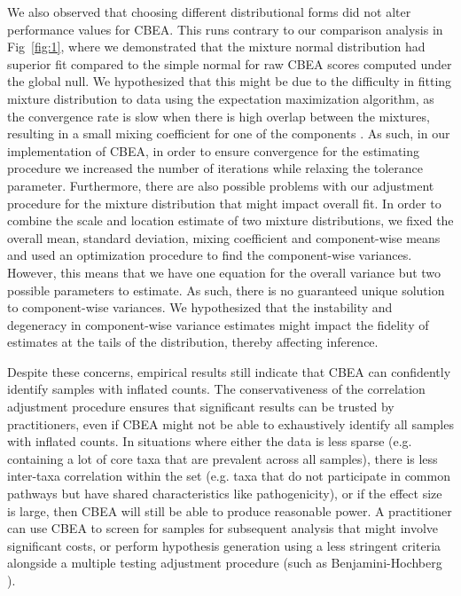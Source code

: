 \documentclass[10pt,letterpaper]{article}
\begin{document}
We also observed that choosing different distributional forms did not alter performance values for CBEA. This runs contrary to our comparison analysis in Fig~\ref{fig:1}, where we demonstrated that the mixture normal distribution had superior fit compared to the simple normal for raw CBEA scores computed under the global null. We hypothesized that this might be due to the difficulty in fitting mixture distribution to data using the expectation maximization algorithm, as the convergence rate is slow when there is high overlap between the mixtures, resulting in a small mixing coefficient for one of the components \cite{naim2012}. As such, in our implementation of CBEA, in order to ensure convergence for the estimating procedure we increased the number of iterations while relaxing the tolerance parameter. Furthermore, there are also possible problems with our adjustment procedure for the mixture distribution that might impact overall fit. In order to combine the scale and location estimate of two mixture distributions, we fixed the overall mean, standard deviation, mixing coefficient and component-wise means and used an optimization procedure to find the component-wise variances. However, this means that we have one equation for the overall variance but two possible parameters to estimate. As such, there is no guaranteed unique solution to component-wise variances. We hypothesized that the instability and degeneracy in component-wise variance estimates might impact the fidelity of estimates at the tails of the distribution, thereby affecting inference.  

Despite these concerns, empirical results still indicate that CBEA can confidently identify samples with inflated counts. The conservativeness of the correlation adjustment procedure ensures that significant results can be trusted by practitioners, even if CBEA might not be able to exhaustively identify all samples with inflated counts. In situations where either the data is less sparse (e.g. containing a lot of core taxa that are prevalent across all samples), there is less inter-taxa correlation within the set (e.g. taxa that do not participate in common pathways but have shared characteristics like pathogenicity), or if the effect size is large, then CBEA will still be able to produce reasonable power. A practitioner can use CBEA to screen for samples for subsequent analysis that might involve significant costs, or perform hypothesis generation using a less stringent criteria alongside a multiple testing adjustment procedure (such as Benjamini-Hochberg \cite{benjamini1995}). 
\end{document}

